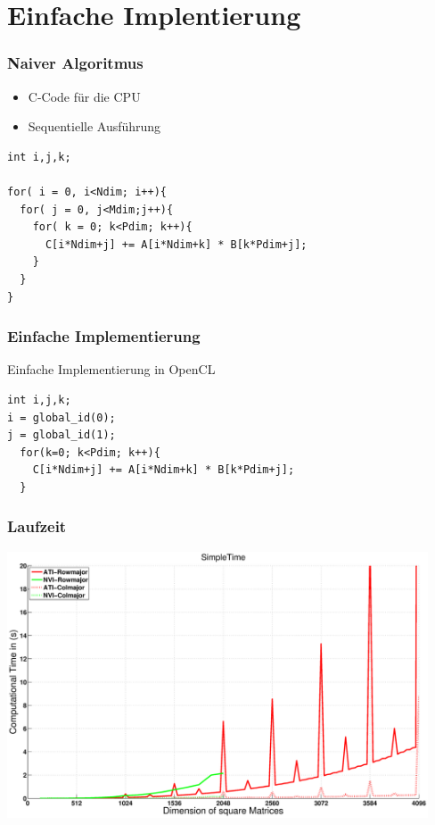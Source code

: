 \documentclass{beamer}
\begin{document}
\section{Einfache Implentierung}



\begin{frame}[fragile]
\frametitle{Naiver Algoritmus}

\begin{itemize}
\item C-Code f\"ur die CPU 
\item Sequentielle Ausf\"uhrung
\end{itemize}

\begin{lstlisting}[style=customc,caption=Matrixmultiplication in C]
int i,j,k;

for( i = 0, i<Ndim; i++){
  for( j = 0, j<Mdim;j++){
    for( k = 0; k<Pdim; k++){
      C[i*Ndim+j] += A[i*Ndim+k] * B[k*Pdim+j]; 
    }
  }
}
\end{lstlisting}



\end{frame}



\begin{frame}[fragile]
\frametitle{Einfache Implementierung}
 
Einfache Implementierung in OpenCL
\begin{lstlisting}[style=customc,caption=Einfachster Code in OpenCL]
int i,j,k;
i = global_id(0);
j = global_id(1);
  for(k=0; k<Pdim; k++){
    C[i*Ndim+j] += A[i*Ndim+k] * B[k*Pdim+j]; 
  }
\end{lstlisting}


\end{frame}

\begin{frame}
\frametitle{Laufzeit}
\begin{center}
\includegraphics[width=12.5cm]{SimpleTime}
\end{center}

	
\end{frame}
\end{document}

